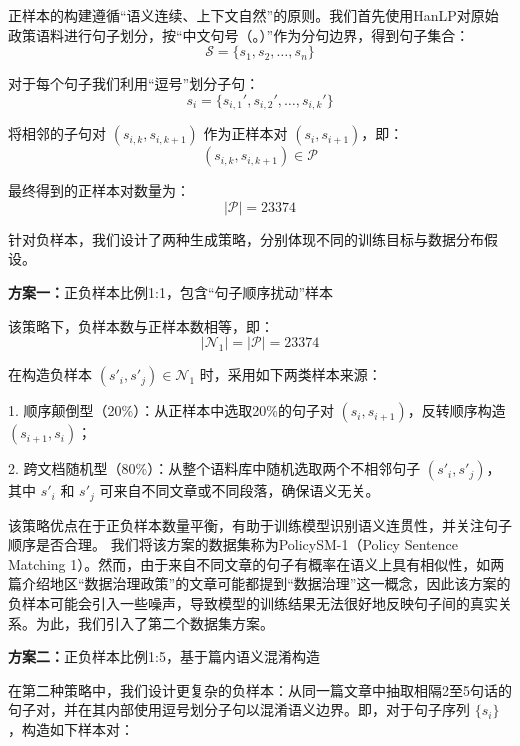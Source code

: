 \documentclass[12pt, a4paper]{ctexart}
\begin{document}
正样本的构建遵循“语义连续、上下文自然”的原则。我们首先使用HanLP对原始政策语料进行句子划分，按“中文句号（。）”作为分句边界，得到句子集合：
\begin{equation}
\mathcal{S} = \{s_1, s_2, \ldots, s_n\}
\end{equation}

对于每个句子我们利用“逗号”划分子句：
\begin{equation}
s_i = \{s_{i,1}', s_{i,2}', \ldots, s_{i,k}'\}
\end{equation}

将相邻的子句对 $(s_{i,k}, s_{i,k+1})$ 作为正样本对 $(s_i, s_{i+1})$，即：
\begin{equation}
(s_{i,k}, s_{i,k+1}) \in \mathcal{P}
\end{equation}

最终得到的正样本对数量为：
\begin{equation}
|\mathcal{P}| = 23374
\end{equation}

针对负样本，我们设计了两种生成策略，分别体现不同的训练目标与数据分布假设。

\textbf{方案一：}正负样本比例1:1，包含“句子顺序扰动”样本

该策略下，负样本数与正样本数相等，即：
\begin{equation}
|\mathcal{N}_1| = |\mathcal{P}| = 23374
\end{equation}

在构造负样本 $(s'_i, s'_j) \in \mathcal{N}_1$ 时，采用如下两类样本来源：

1. 顺序颠倒型（20\%）：从正样本中选取20\%的句子对 $(s_i, s_{i+1})$，反转顺序构造 $(s_{i+1}, s_i)$；

2. 跨文档随机型（80\%）：从整个语料库中随机选取两个不相邻句子 $(s'_i, s'_j)$，其中 $s'_i$ 和 $s'_j$ 可来自不同文章或不同段落，确保语义无关。

该策略优点在于正负样本数量平衡，有助于训练模型识别语义连贯性，并关注句子顺序是否合理。
我们将该方案的数据集称为PolicySM-1（Policy Sentence Matching 1）。然而，由于来自不同文章的句子有概率在语义上具有相似性，如两篇介绍地区“数据治理政策”的文章可能都提到“数据治理”这一概念，因此该方案的负样本可能会引入一些噪声，导致模型的训练结果无法很好地反映句子间的真实关系。为此，我们引入了第二个数据集方案。

\vspace{2em} %

\textbf{方案二：}正负样本比例1:5，基于篇内语义混淆构造

在第二种策略中，我们设计更复杂的负样本：从同一篇文章中抽取相隔2至5句话的句子对，并在其内部使用逗号划分子句以混淆语义边界。即，对于句子序列 $\{s_i\}$，构造如下样本对：
\end{document}
